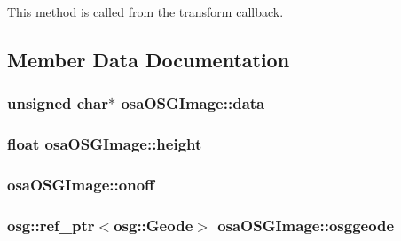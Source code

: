 This method is called from the transform callback. 



\subsection{Member Data Documentation}
\hypertarget{classosa_o_s_g_image_a597695a8798c7a8cb89327da377dc679}{
\subsubsection[{data}]{\setlength{\rightskip}{0pt plus 5cm}unsigned char$\ast$ osa\-O\-S\-G\-Image\-::data\hspace{0.3cm}{\ttfamily [protected]}}}\label{classosa_o_s_g_image_a597695a8798c7a8cb89327da377dc679}
\hypertarget{classosa_o_s_g_image_aaec6b37a20e1855336360b1825f7b4a6}{
\subsubsection[{height}]{\setlength{\rightskip}{0pt plus 5cm}float osa\-O\-S\-G\-Image\-::height\hspace{0.3cm}{\ttfamily [protected]}}}\label{classosa_o_s_g_image_aaec6b37a20e1855336360b1825f7b4a6}
\hypertarget{classosa_o_s_g_image_afa4051f9cb78f98370739416e7411854}{
\subsubsection[{onoff}]{ osa\-O\-S\-G\-Image\-::onoff\hspace{0.3cm}{\ttfamily [protected]}}}\label{classosa_o_s_g_image_afa4051f9cb78f98370739416e7411854}
\hypertarget{classosa_o_s_g_image_a972cf8e8088d4fa639c0b7f17dbc3344}{
\subsubsection[{osggeode}]{\setlength{\rightskip}{0pt plus 5cm}osg\-::ref\-\_\-ptr$<$osg\-::\-Geode$>$ osa\-O\-S\-G\-Image\-::osggeode\hspace{0.3cm}{\ttfamily [protected]}}}\label{classosa_o_s_g_image_a972cf8e8088d4fa639c0b7f17dbc3344}
